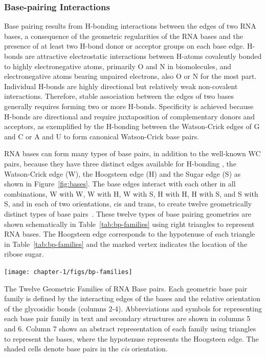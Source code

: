 \subsubsection{Base-pairing Interactions}

Base pairing results from H-bonding interactions between the edges of two RNA
bases, a consequence of the geometric regularities of the RNA bases and the
presence of at least two H-bond donor or acceptor groups on each base edge.
H-bonds are attractive electrostatic interactions between H-atoms covalently
bonded to highly electronegative atoms, primarily O and N in biomolecules, and
electronegative atoms bearing unpaired electrons, also O or N for the most part.
Individual H-bonds are highly directional but relatively weak non-covalent
interactions. Therefore, stable association between the edges of two bases
generally requires forming two or more H-bonds. Specificity is achieved because
H-bonds are directional and require juxtaposition of complementary donors and
acceptors, as exemplified by the H-bonding between the Watson-Crick edges of G
and C or A and U to form canonical Watson-Crick base pairs. 

RNA bases can form many types of base pairs, in addition to the well-known WC
pairs, because they have three distinct edges available for H-bonding
\cite{Leontis2001, Leontis2002f}, the Watson-Crick edge (W), the Hoogsteen edge
(H) and the Sugar edge (S) as shown in Figure~\ref{fig:bases}. The base edges
interact with each other in all combinations, W with W, W with H, W with S, H
with H, H with S, and S with S, and in each of two orientations, cis and trans,
to create twelve geometrically distinct types of base pairs~\cite{Leontis2001}.
These twelve types of base pairing geometries are shown schematically in Table~\ref{tab:bp-families}
using right triangles to represent RNA bases. The Hoogsteen edge corresponds to
the hypotenuse of each triangle in Table~\ref{tab:bp-families} and the marked vertex indicates the
location of the ribose sugar. 

\begin{table}
  \texttt{[image: chapter-1/figs/bp-families]}
  \caption{The Twelve Geometric Families of RNA Base pairs. Each geometric
    base pair family is defined by the interacting edges of the bases and the
    relative orientation of the glycosidic bonds (columns 2-4). Abbreviations
    and symbols for representing each base pair family in text and secondary
    structures are shown in columns 5 and 6. Column 7 shows an abstract
    representation of each family using triangles to represent the bases,
    where the hypotenuse represents the Hoogsteen edge. The shaded cells
  denote base pairs in the \emph{cis} orientation. }
\label{tab:bp-families}
\end{table}

